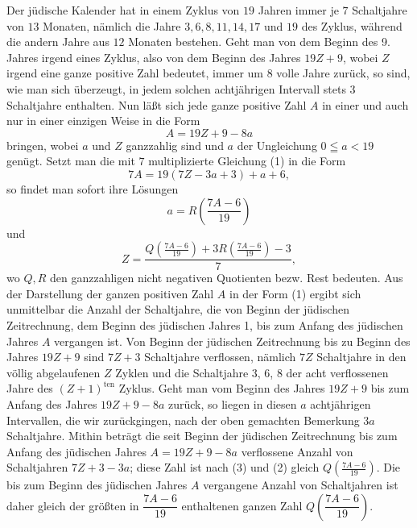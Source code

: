 Der jüdische Kalender hat in einem Zyklus von $19$ Jahren immer je $7$ Schaltjahre von $13$ Monaten, nämlich die Jahre $3,6,8,11,14,17$ und $19$ des Zyklus, während die andern Jahre aus $12$ Monaten bestehen. Geht man von dem Beginn des 9. Jahres irgend eines Zyklus, also von dem Beginn des Jahres $19Z+9$, wobei $Z$ irgend eine ganze positive Zahl bedeutet, immer um $8$ volle Jahre zurück, so sind, wie man sich überzeugt, in jedem solchen achtjährigen Intervall stets $3$ Schaltjahre enthalten. Nun läßt sich jede ganze positive Zahl $A$ in einer und auch nur in einer einzigen Weise in die Form
\begin{equation}
A=19Z+9-8a\tag*{(1)}
\end{equation}
\noindent bringen, wobei $a$ und $Z$ ganzzahlig sind und $a$ der Ungleichung $0\leqq a<19$ genügt. Setzt man die mit $7$ multiplizierte Gleichung (1) in die Form
\begin{equation}
7A=19(7Z-3a+3)+a+6,\tag*{(1*)}
\end{equation}
\noindent so findet man sofort ihre Lösungen
\begin{equation}
a=R\left(\frac{7A-6}{19}\right)\tag*{(2)}
\end{equation}
\noindent und
\begin{equation}
Z=\frac{Q\left(\frac{7A-6}{19}\right)+3R\left(\frac{7A-6}{19}\right)-3}{7},\tag*{(3)}
\end{equation}
\noindent wo $Q,R$ den ganzzahligen nicht negativen Quotienten bezw. Rest bedeuten. Aus der Darstellung der ganzen positiven Zahl $A$ in der Form (1) ergibt sich unmittelbar die Anzahl der Schaltjahre, die von Beginn der jüdischen Zeitrechnung, dem Beginn des jüdischen Jahres 1, bis zum Anfang des jüdischen Jahres $A$ vergangen ist. Von Beginn der jüdischen Zeitrechnung bis zu Beginn des Jahres $19Z+9$ sind $7Z+3$ Schaltjahre verflossen, nämlich $7Z$ Schaltjahre in den völlig abgelaufenen $Z$ Zyklen und die Schaltjahre 3, 6, 8 der acht verflossenen Jahre des $(Z+1)^{\mathrm{ten}}$ Zyklus. Geht man vom Beginn des Jahres $19Z+9$ bis zum Anfang des Jahres $19Z+9-8a$ zurück, so liegen in diesen $a$ achtjährigen Intervallen, die wir zurückgingen, nach der oben gemachten Bemerkung $3a$ Schaltjahre. Mithin beträgt die seit Beginn der jüdischen Zeitrechnung bis zum Anfang des jüdischen Jahres $A=19Z+9-8a$ verflossene Anzahl von Schaltjahren $7Z+3-3a$; diese Zahl ist nach (3) und (2) gleich $Q\left(\frac{7A-6}{19}\right)$. Die bis zum Beginn des jüdischen Jahres
\clearpage{}
\noindent $A$ vergangene Anzahl von Schaltjahren ist daher gleich der größten in $\dfrac{7A-6}{19}$ enthaltenen ganzen Zahl $Q\left(\dfrac{7A-6}{19}\right)$.

